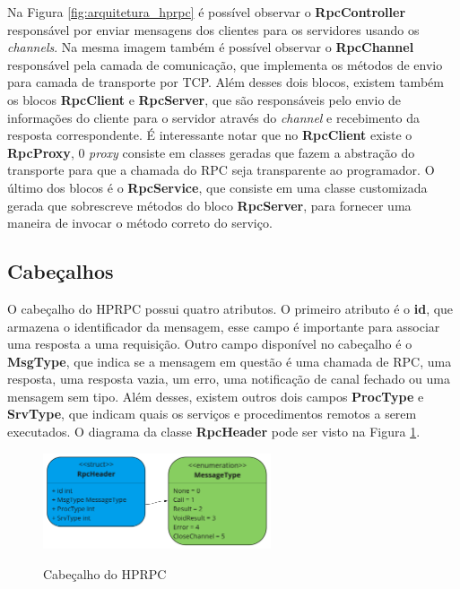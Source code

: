 Na Figura \ref{fig:arquitetura_hprpc} é possível observar o \textbf{RpcController} responsável por enviar mensagens dos clientes para os servidores usando os \textit{channels}. Na mesma imagem também é possível observar o \textbf{RpcChannel} responsável pela camada de comunicação, que implementa os métodos de envio para camada de transporte por TCP. Além desses dois blocos, existem também os blocos \textbf{RpcClient} e \textbf{RpcServer}, que são responsáveis pelo envio de informações do cliente para o servidor através do \textit{channel} e recebimento da resposta correspondente. É interessante notar que no \textbf{RpcClient} existe o \textbf{RpcProxy}, 0 \textit{proxy} consiste em classes geradas que fazem a abstração do transporte para que a chamada do RPC seja transparente ao programador. O último dos blocos é o \textbf{RpcService}, que consiste em uma classe customizada gerada que sobrescreve métodos do bloco \textbf{RpcServer}, para fornecer uma maneira de invocar o método correto do serviço.

\subsection{Cabeçalhos}

O cabeçalho do HPRPC possui quatro atributos. O primeiro atributo é o \textbf{id}, que armazena o identificador da mensagem, esse campo é importante para associar uma resposta a uma requisição. Outro campo disponível no cabeçalho é o \textbf{MsgType}, que indica se a mensagem em questão é uma chamada de RPC, uma resposta, uma resposta vazia, um erro, uma notificação de canal fechado ou uma mensagem sem tipo. Além desses, existem outros dois campos \textbf{ProcType} e \textbf{SrvType}, que indicam quais os serviços e procedimentos remotos a serem executados. O diagrama da classe \textbf{RpcHeader} pode ser visto na Figura \ref{fig:cabecalho_hprpc}.

\begin{figure}[ht]
    \centering
    \caption{Cabeçalho do HPRPC}
    \includegraphics[width=0.6\textwidth]{figuras/diagramas/cap2/cabecalho_hprpc.png} 
    \label{fig:cabecalho_hprpc}
\end{figure}

